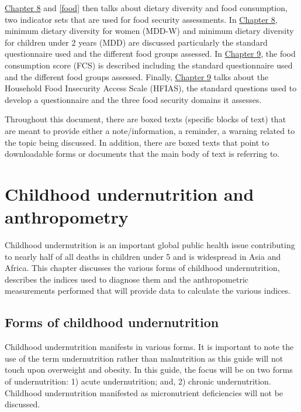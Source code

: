 \documentclass[12pt,]{book}
\theoremstyle{definition}
\theoremstyle{definition}
\theoremstyle{definition}
\theoremstyle{remark}
\begin{document}
\protect\hyperlink{diet}{Chapter 8} and \ref{food} then talks about
dietary diversity and food consumption, two indicator sets that are used
for food security assessments. In \protect\hyperlink{diet}{Chapter 8},
minimum dietary diversity for women (MDD-W) and minimum dietary
diversity for children under 2 years (MDD) are discussed particularly
the standard questionnaire used and the different food groups assessed.
In \protect\hyperlink{food}{Chapter 9}, the food consumption score (FCS)
is described including the standard questionnaire used and the different
food groups assessed. Finally, \protect\hyperlink{hfias}{Chapter 9}
talks about the Household Food Insecurity Access Scale (HFIAS), the
standard questions used to develop a questionnaire and the three food
security domains it assesses.

Throughout this document, there are boxed texts (specific blocks of
text) that are meant to provide either a note/information, a reminder, a
warning related to the topic being discussed. In addition, there are
boxed texts that point to downloadable forms or documents that the main
body of text is referring to.

\hypertarget{anthro}{%
\chapter{Childhood undernutrition and anthropometry}\label{anthro}}

Childhood undernutrition is an important global public health issue
contributing to nearly half of all deaths in children under 5 and is
widespread in Asia and Africa. This chapter discusses the various forms
of childhood undernutrition, describes the indices used to diagnose them
and the anthropometric measurements performed that will provide data to
calculate the various indices.

\hypertarget{forms-of-childhood-undernutrition}{%
\section{Forms of childhood
undernutrition}\label{forms-of-childhood-undernutrition}}

Childhood undernutrition manifests in various forms. It is important to
note the use of the term undernutrition rather than malnutrition as this
guide will not touch upon overweight and obesity. In this guide, the
focus will be on two forms of undernutrition: 1) acute undernutrition;
and, 2) chronic undernutrition. Childhood undernutrition manifested as
micronutrient deficiencies will not be discussed.
\end{document}
